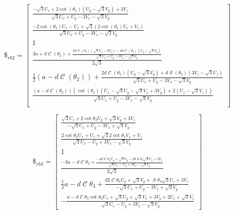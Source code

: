 \documentclass[titlepage, letterpaper]{article}
\DeclareMathOperator{\cose}{\mathcal{C}}
\DeclareMathOperator{\sen}{\mathcal{S}}
\newcommand{\spacepls}{\vspace{5mm}}
\begin{document}
\spacepls

\begin{equation}
    \label{eq:rb2}
    \$_{rb2} =
    \begin{bmatrix}
     \frac{-\sqrt{3} U_z+2 \cot \left(\theta _2\right) \left(U_y-\sqrt{3} V_y\right)+3 V_z}{\sqrt{3} U_x+U_y-3 V_x-\sqrt{3} V_y} \\
     \frac{-2 \cot \left(\theta _2\right) U_x-U_z+\sqrt{3} \left(2 \cot \left(\theta _2\right) V_x+V_z\right)}{\sqrt{3} U_x+U_y-3 V_x-\sqrt{3} V_y} \\
     1 \\
     \frac{3 a+d \cose \left(\theta _2\right)+\frac{2 d \sen \left(\theta _2\right) \left(\sqrt{3} U_z-3 V_z\right)-4 d \cose \left(\theta _2\right) \left(U_y-\sqrt{3} V_y\right)}{\sqrt{3} U_x+U_y-3 V_x-\sqrt{3} V_y}}{2 \sqrt{3}} \\
     \frac{1}{2} \left(a-d \cose \left(\theta _2\right)\right)+\frac{2 d \cose \left(\theta _2\right) \left(U_y-\sqrt{3} V_y\right)+d \sen \left(\theta _2\right) \left(3 V_z-\sqrt{3} U_z\right)}{\sqrt{3} U_x+U_y-3 V_x-\sqrt{3} V_y} \\
     \frac{\left(a-d \cose \left(\theta _2\right)\right) \left(\cot \left(\theta _2\right) \left(U_x-\sqrt{3} U_y-\sqrt{3} V_x+3 V_y\right)+2 \left(U_z-\sqrt{3} V_z\right)\right)}{\sqrt{3} U_x+U_y-3 V_x-\sqrt{3} V_y} \\
    \end{bmatrix}
\end{equation}

\spacepls

\begin{equation}
    \label{eq:rb3}
    \$_{rb3} =
    \begin{bmatrix}
     \frac{\sqrt{3} U_z+2 \cot \theta _3 U_y+\sqrt{3} V_y+3 V_z}{-\sqrt{3} U_x+U_y-3 V_x+\sqrt{3} V_y} \\
     \frac{2 \cot \theta _3 U_x+U_z+\sqrt{3} 2 \cot \theta _3 V_x+V_z}{\sqrt{3} U_x-U_y+3 V_x-\sqrt{3} V_y} \\
     1 \\
     \frac{-3 a-d \cose \theta _3+\frac{-4 d \cose \theta _3 U_y+\sqrt{3} V_y-2 d \sen \theta _3 \sqrt{3} U_z+3 V_z}{\sqrt{3} U_x-U_y+3 V_x-\sqrt{3} V_y}}{2 \sqrt{3}} \\
     \frac{1}{2} a-d \cose \theta _3+\frac{d 2 \cose \theta _3 U_y+\sqrt{3} V_y+\sen \theta _3 \sqrt{3} U_z+3 V_z}{-\sqrt{3} U_x+U_y-3 V_x+\sqrt{3} V_y} \\
     -\frac{a-d \cose \theta _3 \cot \theta _3 U_x+\sqrt{3} U_y+\sqrt{3} V_x+3 V_y+2 U_z+\sqrt{3} V_z}{\sqrt{3} U_x-U_y+3 V_x-\sqrt{3} V_y}
    \end{bmatrix}
\end{equation}
\end{document}
